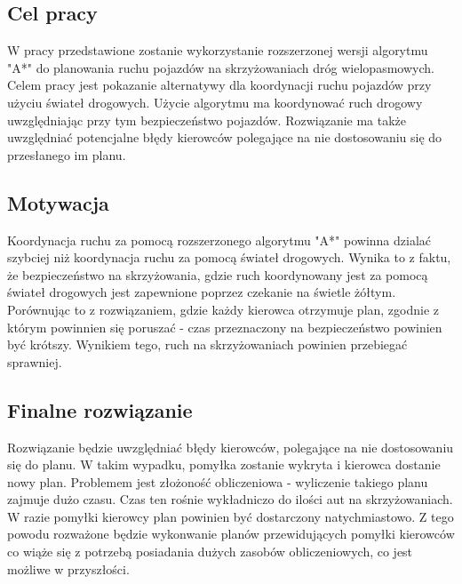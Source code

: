 \documentclass[../main.tex]{subfiles}
\begin{document}
 
\begin{figure}[bh]
\centering
 
\end{figure}

\subsection{Cel pracy}

W pracy przedstawione zostanie wykorzystanie rozszerzonej wersji algorytmu "A*" do planowania ruchu pojazdów na skrzyżowaniach dróg wielopasmowych. Celem pracy jest pokazanie alternatywy dla koordynacji ruchu pojazdów przy użyciu świateł drogowych. Użycie algorytmu ma koordynować ruch drogowy uwzględniając przy tym bezpieczeństwo pojazdów. Rozwiązanie ma także uwzględniać potencjalne błędy kierowców polegające na nie dostosowaniu się do przesłanego im planu.

\subsection{Motywacja}

Koordynacja ruchu za pomocą rozszerzonego algorytmu "A*" powinna dzialać szybciej niż koordynacja ruchu za pomocą świateł drogowych. Wynika to z faktu, że bezpieczeństwo na skrzyżowania, gdzie ruch koordynowany jest za pomocą świateł drogowych jest zapewnione poprzez czekanie na świetle żółtym. Porównując to z rozwiązaniem, gdzie każdy kierowca otrzymuje plan, zgodnie z którym powinnien się poruszać - czas przeznaczony na bezpieczeństwo powinien być krótszy. Wynikiem tego, ruch na skrzyżowaniach powinien przebiegać sprawniej.


\subsection{Finalne rozwiązanie}

Rozwiązanie będzie uwzględniać błędy kierowców, polegające na nie dostosowaniu się do planu. W takim wypadku, pomyłka zostanie wykryta i kierowca dostanie nowy plan. Problemem jest złożoność obliczeniowa - wyliczenie takiego planu zajmuje dużo czasu. Czas ten rośnie wykładniczo do ilości aut na skrzyżowaniach. W razie pomyłki kierowcy plan powinien być dostarczony natychmiastowo. Z tego powodu rozważone będzie wykonwanie planów przewidujących pomyłki kierowców co wiąże się z potrzebą posiadania dużych zasobów obliczeniowych, co jest możliwe w przyszłości.
\end{document}
